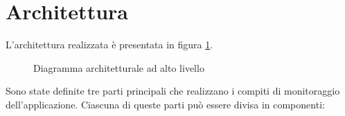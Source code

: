 \section{Architettura}
L'architettura realizzata è presentata in figura \ref{img:architecture}.

\begin{figure}[!ht]
\begin{center}
\caption{Diagramma architetturale ad alto livello}
\label{img:architecture}
\end{center}
\end{figure}

Sono state definite tre parti principali che realizzano i compiti di monitoraggio dell'applicazione. Ciascuna di queste parti può essere divisa in componenti:


